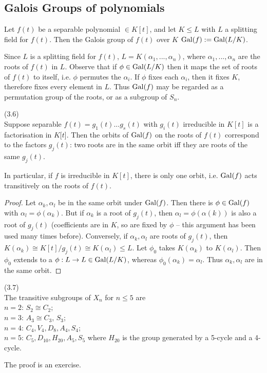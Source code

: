 \documentclass[a4paper]{article}
\begin{document}
\subsection{Galois Groups of polynomials}

\begin{defi}
Let $f(t)$ be a separable polynomial $\in K[t]$, and let $K \leq L$ with $L$ a splitting field for $f(t)$. Then the Galois group of $f(t)$ over $K$ $\operatorname{Gal}(f) := \operatorname{Gal}(L/K)$.
\end{defi}

Since $L$ is a splitting field for $f(t)$, $L = K(\alpha_1,...,\alpha_n)$, where $\alpha_1,...,\alpha_n$ are the roots of $f(t)$ in $L$. Observe that if $\phi \in \operatorname{Gal}(L/K)$ then it maps the set of roots of $f(t)$ to itself, i.e. $\phi$ permutes the $\alpha_i$. If $\phi$ fixes each $\alpha_i$, then it fixes $K$, therefore fixes every element in $L$. Thus $\operatorname{Gal}(f)$ may be regarded as a permutation group of the roots, or as a subgroup of $S_n$.

\begin{lemma} (3.6)\\
Suppose separable $f(t) = g_1(t) ... g_s(t)$ with $g_i(t)$ irreducible in $K[t]$ is a factorisation in $K[t$]. Then the orbits of $\operatorname{Gal}(f)$ on the roots of $f(t)$ correspond to the factors $g_j(t)$: two roots are in the same orbit iff they are roots of the same $g_j(t)$.

In particular, if $f$ is irreducible in $K[t]$, there is only one orbit, i.e. $\operatorname{Gal}(f)$ acts transitively on the roots of $f(t)$.
\begin{proof}
Let $\alpha_k,\alpha_l$ be in the same orbit under $\operatorname{Gal}(f)$. Then there is $\phi \in \operatorname{Gal}(f)$ with $\alpha_l = \phi(\alpha_k)$. But if $\alpha_k$ is a root of $g_j(t)$, then $\alpha_l=\phi(\alpha(k))$ is also a root of $g_j(t)$ (coefficients are in $K$, so are fixed by $\phi$ -- this argument has been used many times before). Conversely, if $\alpha_k,\alpha_l$ are roots of $g_j(t)$, then $K(\alpha_k) \cong K[t] / g_j(t) \cong K(\alpha_l) \leq L$. Let $\phi_0$ takes $K(\alpha_k)$ to $K(\alpha_l)$. Then $\phi_0$ extends to a $\phi:L \to L \in \operatorname{Gal}(L/K)$, whereas $\phi_0(\alpha_k) = \alpha_l$. Thus $\alpha_k,\alpha_l$ are in the same orbit.
\end{proof}
\end{lemma}

\begin{lemma} (3.7)\\
The transitive subgroups of $X_n$ for $n \leq 5$ are\\
$n=2$: $S_2 \cong C_2$;\\
$n=3$: $A_3 \cong C_3$, $S_3$;\\
$n=4$: $C_4,V_4,D_8,A_4,S_4$;\\
$n=5$: $C_5,D_{10},H_{20},A_5,S_5$ where $H_{20}$ is the group generated by a 5-cycle and a 4-cycle.

The proof is an exercise.
\end{lemma}
\end{document}
